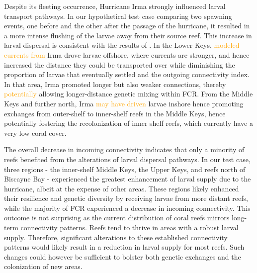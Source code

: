 \documentclass[fleqn,10pt]{wlscirep}
\newcommand{\modif}[1]{\textcolor{orange}{#1}}
\begin{document}
Despite its fleeting occurrence, Hurricane Irma strongly influenced larval transport pathways. In our hypothetical test case comparing two spawning events, one before and the other after the passage of the hurricane, it resulted in a more intense flushing of the larvae away from their source reef. This increase in larval dispersal is consistent with the results of \cite{grimaldi2022hydrodynamic}. In the Lower Keys, \modif{modeled currents from} Irma drove larvae offshore, where currents are stronger, and hence increased the distance they could be transported over while diminishing the proportion of larvae that eventually settled and the outgoing connectivity index. In that area, Irma promoted longer but also weaker connections, thereby \modif{potentially} allowing longer-distance genetic mixing within FCR. From the Middle Keys and further north, Irma \modif{may have driven} larvae inshore hence promoting exchanges from outer-shelf to inner-shelf reefs in the Middle Keys, hence potentially fostering the recolonization of inner shelf reefs, which currently have a very low coral cover.

The overall decrease in incoming connectivity indicates that only a minority of reefs benefited from the alterations of larval dispersal pathways. In our test case, three regions - the inner-shelf Middle Keys, the Upper Keys, and reefs north of Biscayne Bay - experienced the greatest enhancement of larval supply due to the hurricane, albeit at the expense of other areas. These regions likely enhanced their resilience and genetic diversity by receiving larvae from more distant reefs, while the majority of FCR experienced a decrease in incoming connectivity. This outcome is not surprising as the current distribution of coral reefs mirrors long-term connectivity patterns. Reefs tend to thrive in areas with a robust larval supply. Therefore, significant alterations to these established connectivity patterns would likely result in a reduction in larval supply for most reefs. Such changes could however be sufficient to bolster both genetic exchanges and the colonization of new areas.
\end{document}
